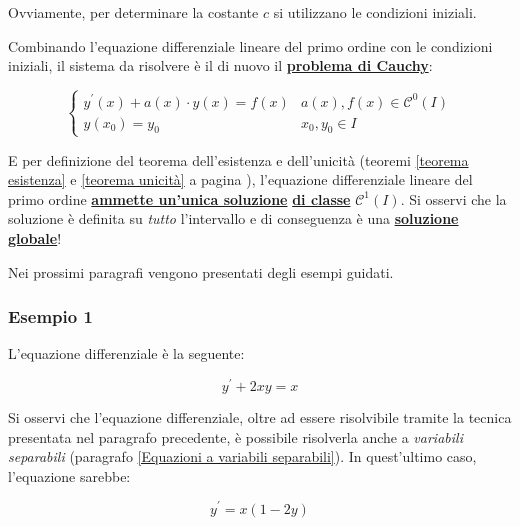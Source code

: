 \documentclass[a4paper]{article}
\begin{document}
	\noindent
	Ovviamente, per determinare la costante $c$ si utilizzano le condizioni iniziali.
	
	\newpage
	
	\noindent
	Combinando l'equazione differenziale lineare del primo ordine con le condizioni iniziali, il sistema da risolvere è il di nuovo il \textcolor{Red3}{\textbf{\underline{problema di Cauchy}}}:
	
	\begin{equation*}
		\begin{cases}
			y^{'}\left(x\right) + a\left(x\right) \cdot y\left(x\right) = f\left(x\right)	& a\left(x\right), f\left(x\right) \in \mathcal{C}^{0}\left(I\right) \\
			y\left(x_{0}\right) = y_{0}														& x_{0}, y_{0} \in I
		\end{cases}
	\end{equation*}

	\noindent
	E per definizione del teorema dell'esistenza e dell'unicità (teoremi \ref{teorema esistenza} e \ref{teorema unicità} a pagina \pageref{teorema esistenza}), l'equazione differenziale lineare del primo ordine \textbf{\underline{ammette un'unica soluzione}} \textbf{\underline{di classe}} $\mathcal{C}^{1}\left(I\right)$. Si osservi che la soluzione è definita su \emph{tutto} l'intervallo e di conseguenza è una \textbf{\underline{soluzione globale}}!\newline
	
	\noindent
	Nei prossimi paragrafi vengono presentati degli esempi guidati.
	
	\newpage
	
	\subsubsection[Esempio 1]{\textcolor{Green4}{\textbf{Esempio 1}}}
	
	L'equazione differenziale è la seguente:
	
	\begin{equation*}
		y^{'} + 2xy = x
	\end{equation*}

	\noindent
	Si osservi che l'equazione differenziale, oltre ad essere risolvibile tramite la tecnica presentata nel paragrafo precedente, è possibile risolverla anche a \emph{variabili separabili} (paragrafo \ref{Equazioni a variabili separabili}). In quest'ultimo caso, l'equazione sarebbe:
	
	\begin{equation*}
		y^{'} = x\left(1-2y\right)
	\end{equation*}
\end{document}
